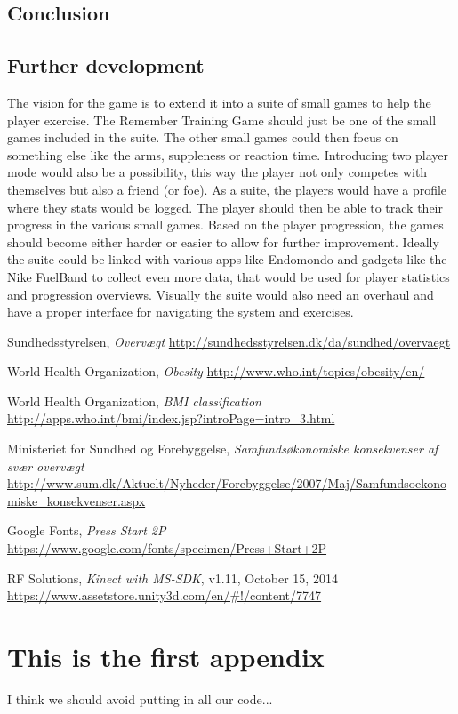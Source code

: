 \documentclass[11pt]{report}
\begin{document}
\section{Conclusion}


\section{Further development}
The vision for the game is to extend it into a suite of small games to help the player exercise. The Remember Training Game should just be one of the small games included in the suite. The other small games could then focus on something else like the arms, suppleness or reaction time. Introducing two player mode would also be a possibility, this way the player not only competes with themselves but also a friend (or foe). As a suite, the players would have a profile where they stats would be logged. The player should then be able to track their progress in the various small games. Based on the player progression, the games should become either harder or easier to allow for further improvement. Ideally the suite could be linked with various apps like Endomondo and gadgets like the Nike FuelBand to collect even more data, that would be used for player statistics and progression overviews. Visually the suite would also need an overhaul and have a proper interface for navigating the system and exercises.


\begin{thebibliography}{9}
  Sundhedsstyrelsen,
  \emph{Overv\ae gt}
  \url{http://sundhedsstyrelsen.dk/da/sundhed/overvaegt}

	World Health Organization,
	\emph{Obesity}
	\url{http://www.who.int/topics/obesity/en/}
	
	World Health Organization,
	\emph{BMI classification}
	\url{http://apps.who.int/bmi/index.jsp?introPage=intro_3.html}

	Ministeriet for Sundhed og Forebyggelse,
	\emph{Samfunds\o konomiske konsekvenser af sv\ae r overv\ae gt}
	\url{http://www.sum.dk/Aktuelt/Nyheder/Forebyggelse/2007/Maj/Samfundsoekonomiske_konsekvenser.aspx}

	Google Fonts, \emph{Press Start 2P}
	\url{https://www.google.com/fonts/specimen/Press+Start+2P}
	
	RF Solutions, \emph{Kinect with MS-SDK}, v1.11, October 15, 2014
	\url{https://www.assetstore.unity3d.com/en/#!/content/7747}

\end{thebibliography}


\appendix

\chapter{This is the first appendix}
I think we should avoid putting in all our code...
\end{document}
